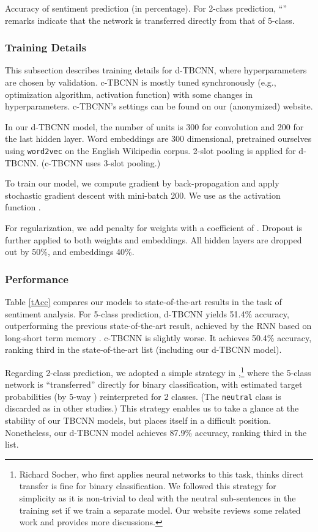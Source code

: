 \documentclass[11pt,a4paper]{article}
\begin{document}
\begin{table*}
\vspace{-.2cm}
\caption{Accuracy of sentiment prediction (in percentage).
For 2-class prediction, ``'' remarks indicate that the network
is transferred directly from that of
5-class. 
}\label{tAcc}

\vspace{-.3cm}
\end{table*}

\subsubsection{Training Details}\label{ssHyperparameter}
This subsection describes training details for d-TBCNN,
where hyperparameters are chosen by validation.
c-TBCNN is mostly tuned synchronously (e.g., optimization algorithm, activation function)
with some changes in hyperparameters. c-TBCNN's settings can be found on our
(anonymized) website.

In our d-TBCNN model, the number of units is 300 for convolution and 200 for the last hidden layer.
Word embeddings are 300 dimensional,
pretrained ourselves using \verb|word2vec| \cite{word2vec} on the English Wikipedia corpus.
2-slot pooling is applied for d-TBCNN. (c-TBCNN uses 3-slot pooling.)

To train our model, we compute gradient by back-propagation
and apply stochastic gradient descent with mini-batch 200.
We use  \cite{relu} as the activation function .

For regularization, we add  penalty for weights
with a coefficient of .
Dropout \cite{dropout}
is further applied to both weights and embeddings.
All hidden layers are dropped out by 50\%, and
embeddings 40\%.



\subsubsection{Performance}
Table \ref{tAcc} compares our models to state-of-the-art results in the task of sentiment analysis.
For 5-class prediction, d-TBCNN yields 51.4\% accuracy, outperforming the previous state-of-the-art result,
achieved by the RNN based on long-short term memory \cite{lstm1}.
c-TBCNN is slightly worse.
It achieves 50.4\% accuracy, ranking third in the
state-of-the-art list (including our d-TBCNN model).


Regarding 2-class prediction, we adopted a simple strategy in ,\footnote{
Richard Socher, who first applies neural networks to this task,
thinks direct transfer is fine for binary classification. 
We followed this strategy for simplicity
as it is non-trivial to deal with the neutral sub-sentences in the training set 
if we train a  separate model. 
Our website reviews some related work and provides more discussions.}
where the 5-class network is ``transferred'' directly for binary classification,
with estimated target probabilities
(by 5-way ) reinterpreted for 2 classes.
(The \verb|neutral| class is discarded as in other studies.)
This strategy enables us to take a glance at the stability of our TBCNN models, but places
itself in a difficult position. Nonetheless, our d-TBCNN model achieves 87.9\%
accuracy, ranking third in the list.
\end{document}
